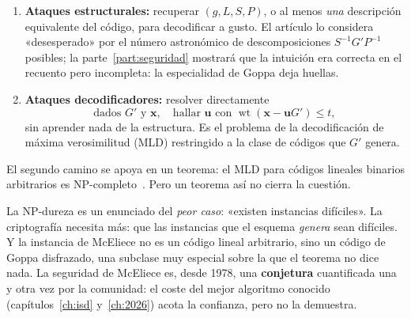 \documentclass[11pt,a4paper,oneside]{report}
\newcommand{\wt}{\operatorname{wt}}
\newcommand{\vx}{\mathbf{x}}
\newcommand{\vu}{\mathbf{u}}
\begin{document}
\begin{enumerate}[leftmargin=1.6em,itemsep=3pt]
  \item \textbf{Ataques estructurales:} recuperar $(g,L,S,P)$, o al
        menos \emph{una} descripción equivalente del código, para
        decodificar a gusto. El artículo lo considera «desesperado»
        por el número astronómico de descomposiciones
        $S^{-1}G'P^{-1}$ posibles; la parte~\ref{part:seguridad}
        mostrará que la intuición era correcta en el recuento pero
        incompleta: la especialidad de Goppa deja huellas.
  \item \textbf{Ataques decodificadores:} resolver directamente
        \begin{equation}
          \text{dados } G' \text{ y } \vx,\quad
          \text{hallar } \vu \text{ con }
          \wt(\vx-\vu G')\le t,
          \label{eq:1978-mld}
        \end{equation}
        sin aprender nada de la estructura. Es el problema de la
        decodificación de máxima verosimilitud (MLD) restringido a la
        clase de códigos que $G'$ genera.
\end{enumerate}

El segundo camino se apoya en un teorema: el MLD para códigos lineales
binarios arbitrarios es NP-completo~\cite{bcmv1978}. Pero un teorema
así no cierra la cuestión.

\begin{rigor}
La NP-dureza es un enunciado del \emph{peor caso}: «existen instancias
difíciles». La criptografía necesita más: que las instancias que el
esquema \emph{genera} sean difíciles. Y la instancia de McEliece no es
un código lineal arbitrario, sino un código de Goppa disfrazado, una
subclase muy especial sobre la que el teorema no dice nada. La
seguridad de McEliece es, desde 1978, una \textbf{conjetura}
cuantificada una y otra vez por la comunidad: el coste del mejor
algoritmo conocido (capítulos~\ref{ch:isd} y~\ref{ch:2026}) acota la
confianza, pero no la demuestra.
\end{rigor}
\end{document}
